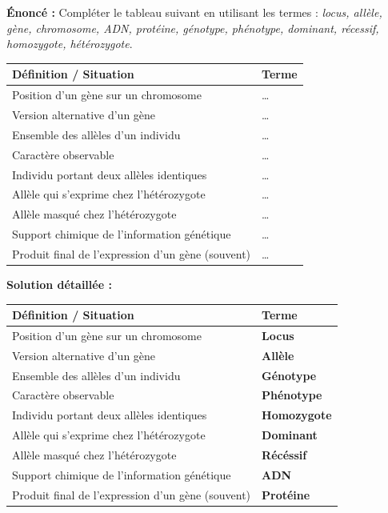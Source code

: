 \documentclass[11pt]{article}
\begin{document}
\begin{exoresolu}
\textbf{Énoncé :} Compléter le tableau suivant en utilisant les termes : \emph{locus, allèle, gène, chromosome, ADN, protéine, génotype, phénotype, dominant, récessif, homozygote, hétérozygote}.

\begin{center}
\begin{tabularx}{\linewidth}{|l|X|}\hline
\textbf{Définition / Situation} & \textbf{Terme} \\ \hline
Position d'un gène sur un chromosome & \ldots \\ \hline
Version alternative d'un gène & \ldots \\ \hline
Ensemble des allèles d'un individu & \ldots \\ \hline
Caractère observable & \ldots \\ \hline
Individu portant deux allèles identiques & \ldots \\ \hline
Allèle qui s'exprime chez l'hétérozygote & \ldots \\ \hline
Allèle masqué chez l'hétérozygote & \ldots \\ \hline
Support chimique de l'information génétique & \ldots \\ \hline
Produit final de l'expression d'un gène (souvent) & \ldots \\ \hline
\end{tabularx}
\end{center}

\textbf{Solution détaillée :}
\begin{center}
\begin{tabularx}{\linewidth}{|l|X|}\hline
\textbf{Définition / Situation} & \textbf{Terme} \\ \hline
Position d'un gène sur un chromosome & \textbf{Locus} \\ \hline
Version alternative d'un gène & \textbf{Allèle} \\ \hline
Ensemble des allèles d'un individu & \textbf{Génotype} \\ \hline
Caractère observable & \textbf{Phénotype} \\ \hline
Individu portant deux allèles identiques & \textbf{Homozygote} \\ \hline
Allèle qui s'exprime chez l'hétérozygote & \textbf{Dominant} \\ \hline
Allèle masqué chez l'hétérozygote & \textbf{Récéssif} \\ \hline
Support chimique de l'information génétique & \textbf{ADN} \\ \hline
Produit final de l'expression d'un gène (souvent) & \textbf{Protéine} \\ \hline
\end{tabularx}
\end{center}
\end{exoresolu}
\end{document}
